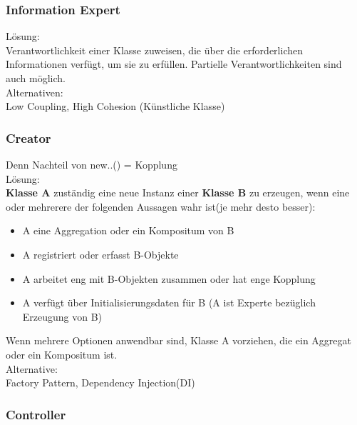 \documentclass[../ZF_SWEN1.tex]{subfiles}
\begin{document}
\subsubsection{Information Expert}

Lösung:\\
Verantwortlichkeit einer Klasse zuweisen, die über die erforderlichen Informationen verfügt, um sie zu erfüllen. Partielle Verantwortlichkeiten sind auch möglich.\\
Alternativen:\\
Low Coupling, High Cohesion (Künstliche Klasse)



\subsubsection{Creator}
Denn Nachteil von new..() = Kopplung\\
Lösung:\\
\textbf {Klasse A} zuständig eine neue Instanz einer \textbf{Klasse B} zu erzeugen, wenn eine oder mehrerere der folgenden Aussagen wahr ist(je mehr desto besser):\\
\begin{itemize}
	\item A eine Aggregation oder ein Kompositum von B
	\item A registriert oder erfasst B-Objekte
	\item A arbeitet eng mit B-Objekten zusammen oder hat enge Kopplung
	\item A verfügt über Initialisierungsdaten für B (A ist Experte bezüglich Erzeugung von B)
\end{itemize}
Wenn mehrere Optionen anwendbar sind, Klasse A vorziehen, die ein Aggregat oder ein Kompositum ist.\\
Alternative:\\
Factory Pattern, Dependency Injection(DI)

\subsubsection{Controller}
\end{document}
